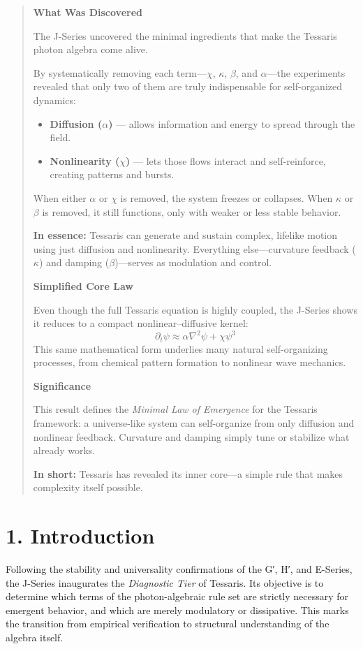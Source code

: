 \documentclass[12pt]{article}
\begin{document}
\begin{quote}
\textbf{What Was Discovered}

The J-Series uncovered the minimal ingredients that make the Tessaris photon algebra come alive.

By systematically removing each term---$\chi$, $\kappa$, $\beta$, and $\alpha$---the experiments revealed that only two of them are truly indispensable for self-organized dynamics:

\begin{itemize}
  \item \textbf{Diffusion ($\alpha$)} — allows information and energy to spread through the field.  
  \item \textbf{Nonlinearity ($\chi$)} — lets those flows interact and self-reinforce, creating patterns and bursts.
\end{itemize}

When either $\alpha$ or $\chi$ is removed, the system freezes or collapses.  
When $\kappa$ or $\beta$ is removed, it still functions, only with weaker or less stable behavior.

\textbf{In essence:} Tessaris can generate and sustain complex, lifelike motion using just diffusion and nonlinearity.
Everything else---curvature feedback ($\kappa$) and damping ($\beta$)---serves as modulation and control.

\bigskip
\textbf{Simplified Core Law}

Even though the full Tessaris equation is highly coupled, the J-Series shows it reduces to a compact nonlinear–diffusive kernel:
\[
\partial_t \psi \approx \alpha \nabla^2 \psi + \chi \psi^3
\]
This same mathematical form underlies many natural self-organizing processes,
from chemical pattern formation to nonlinear wave mechanics.

\bigskip
\textbf{Significance}

This result defines the \emph{Minimal Law of Emergence} for the Tessaris framework:
a universe-like system can self-organize from only diffusion and nonlinear feedback.
Curvature and damping simply tune or stabilize what already works.

\textbf{In short:} Tessaris has revealed its inner core---a simple rule that makes complexity itself possible.
\end{quote}
\section*{1. Introduction}
Following the stability and universality confirmations of the G′, H′, and E-Series, the J-Series inaugurates the \emph{Diagnostic Tier} of Tessaris.
Its objective is to determine which terms of the photon-algebraic rule set are strictly necessary for emergent behavior, and which are merely modulatory or dissipative.
This marks the transition from empirical verification to structural understanding of the algebra itself.
\end{document}

